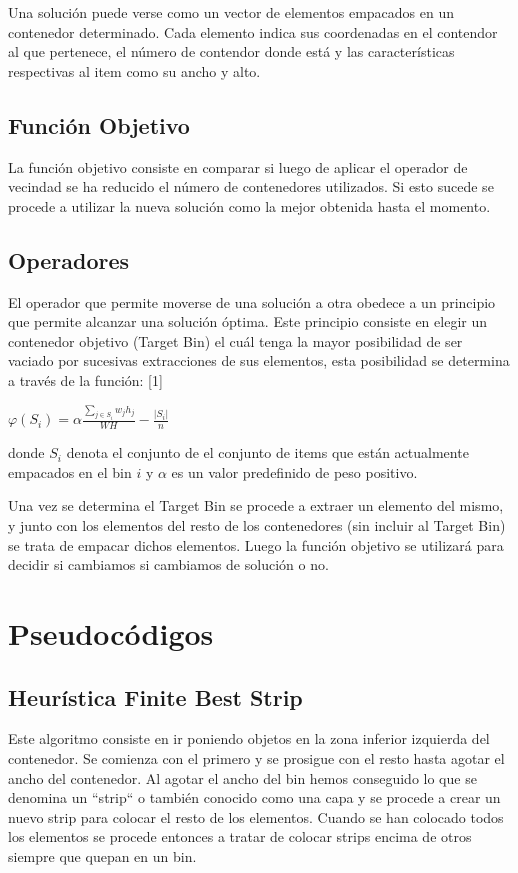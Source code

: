 \documentclass[a4paper,10pt]{article}
\begin{document}
Una solución puede verse como un vector de elementos empacados en un contenedor determinado. Cada elemento indica 
sus coordenadas en el contendor al que pertenece, el número de contendor donde está y las características respectivas al 
item como su ancho y alto. 

\subsection{Función Objetivo}
La función objetivo consiste en comparar si luego de aplicar el operador de vecindad se ha reducido el número de contenedores 
utilizados. Si esto sucede se procede a utilizar la nueva solución como la mejor obtenida hasta el momento.

\subsection{Operadores}
El operador que permite moverse de una solución a otra obedece a un principio que permite alcanzar una solución óptima. Este principio 
consiste en elegir un contenedor objetivo (Target Bin) el cuál tenga la mayor posibilidad de ser vaciado por sucesivas extracciones de 
sus elementos, esta posibilidad se determina a través de la función: [1]

\begin{center}
$\varphi(S_i) = \alpha \frac{\sum_{j \in S_i} {w_j h_j}}{W H} - \frac{|S_i|}{n}$
\end{center}

donde $S_i$ denota el conjunto de el conjunto de items que están actualmente empacados en el bin $i$ y $\alpha$ es un valor 
predefinido de peso positivo.

Una vez se determina el Target Bin se procede a extraer un elemento del mismo, y junto con los elementos del resto de los contenedores 
(sin incluir al Target Bin) se trata de empacar dichos elementos. Luego la función objetivo se utilizará para decidir si cambiamos 
si cambiamos de solución o no.

\section{Pseudocódigos}

\subsection{Heurística Finite Best Strip}
Este algoritmo consiste en ir poniendo objetos en la zona inferior izquierda del contenedor. Se comienza con el primero y se prosigue con 
el resto hasta agotar el ancho del contenedor. Al agotar el ancho del bin hemos conseguido lo que se denomina un ``strip`` o también conocido 
como una capa y se procede a crear un nuevo strip para colocar el resto de los elementos. Cuando se han colocado todos los elementos 
se procede entonces a tratar de colocar strips encima de otros siempre que quepan en un bin.
\end{document}
